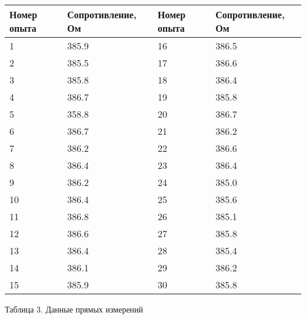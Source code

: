 \documentclass[12pt]{article}
\begin{document}
\begin{enumerate}
\begin{center}
    \begin{tabular}{|l|l|l|l|}
    \hline
        Номер опыта  & Сопротивление, Ом & Номер опыта  & Сопротивление, Ом \\ \hline
        1 & 385.9 & 16 & 386.5 \\ \hline
        2 & 385.5 & 17 & 386.6 \\ \hline
        3 & 385.8 & 18 & 386.4 \\ \hline
        4 & 386.7 & 19 & 385.8 \\ \hline
        5 & 358.8 & 20 & 386.7 \\ \hline
        6 & 386.7 & 21 & 386.2 \\ \hline
        7 & 386.2 & 22 & 386.6 \\ \hline
        8 & 386.4 & 23 & 386.4 \\ \hline
        9 & 386.2 & 24 & 385.0 \\ \hline
        10 & 386.4 & 25 & 385.6 \\ \hline
        11 & 386.8 & 26 & 385.1 \\ \hline
        12 & 386.6 & 27 & 385.8\\ \hline
        13 & 386.4 & 28 & 385.4\\ \hline
        14 & 386.1 & 29 & 386.2\\ \hline
        15 & 385.9 & 30 & 385.8 \\ \hline
    \end{tabular}
\end{center}
    \begin{center}
        Таблица 3. Данные прямых измерений 
       \end{center}


\end{enumerate}
\end{document}
